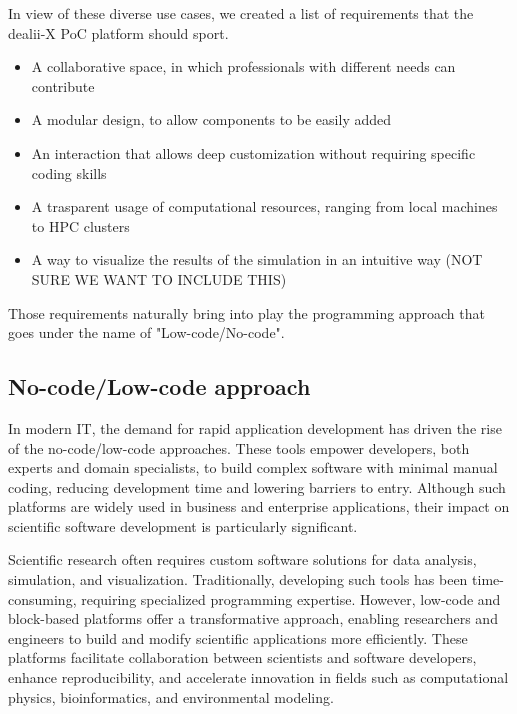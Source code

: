 \documentclass[a4paper,12pt]{article}
\begin{document}
In view of these diverse use cases, we created a list of requirements that the dealii-X PoC platform should sport.
\begin{itemize}
    \item A collaborative space, in which professionals with different needs can contribute
    \item A modular design, to allow components to be easily added
    \item An interaction that allows deep customization without requiring specific coding skills
    \item A trasparent usage of computational resources, ranging from local machines to HPC clusters
    \item A way to visualize the results of the simulation in an intuitive way  (NOT SURE WE WANT TO INCLUDE THIS)
\end{itemize}

Those requirements naturally bring into play the programming approach that goes under the name of "Low-code/No-code".

\subsection{\textcolor{EUblue}{No-code/Low-code approach}}

In modern IT, the demand for rapid application development has driven the rise of the no-code/low-code approaches. These tools empower developers, both experts and domain specialists, to build complex software with minimal manual coding, reducing development time and lowering barriers to entry. Although such platforms are widely used in business and enterprise applications, their impact on scientific software development is particularly significant.

Scientific research often requires custom software solutions for data analysis, simulation, and visualization. Traditionally, developing such tools has been time-consuming, requiring specialized programming expertise. However, low-code and block-based platforms offer a transformative approach, enabling researchers and engineers to build and modify scientific applications more efficiently. These platforms facilitate collaboration between scientists and software developers, enhance reproducibility, and accelerate innovation in fields such as computational physics, bioinformatics, and environmental modeling.
\end{document}
